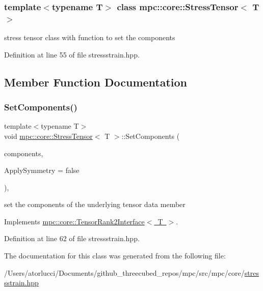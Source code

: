 \subsubsection*{template$<$typename T$>$\newline
class mpc\+::core\+::\+Stress\+Tensor$<$ T $>$}

stress tensor class with function to set the components 

Definition at line 55 of file stressstrain.\+hpp.



\subsection{Member Function Documentation}
\mbox{\label{structmpc_1_1core_1_1_stress_tensor_afbac9aaa45907cdbed3ed779b0551bad}} 
\subsubsection{\texorpdfstring{Set\+Components()}{SetComponents()}}
{\footnotesize\ttfamily template$<$typename T$>$ \\
void \mbox{\hyperlink{structmpc_1_1core_1_1_stress_tensor}{mpc\+::core\+::\+Stress\+Tensor}}$<$ T $>$\+::Set\+Components (\begin{DoxyParamCaption}\item[{std\+::set$<$ \mbox{\hyperlink{namespacempc_1_1core_a467e1fa517a8c269b033fef3aa281360}{mpc\+::core\+::\+Tensor\+Rank2\+Component}}$<$ T $>$ $>$ \&}]{components,  }\item[{bool}]{Apply\+Symmetry = {\ttfamily false} }\end{DoxyParamCaption})\hspace{0.3cm}{\ttfamily [inline]}, {\ttfamily [virtual]}}



set the components of the underlying tensor data member 



Implements \mbox{\hyperlink{structmpc_1_1core_1_1_tensor_rank2_interface_a7d220631fe32f06ec52e5724873a00d9}{mpc\+::core\+::\+Tensor\+Rank2\+Interface$<$ T $>$}}.



Definition at line 62 of file stressstrain.\+hpp.



The documentation for this class was generated from the following file\+:\begin{DoxyCompactItemize}
\item 
/\+Users/atorlucci/\+Documents/github\+\_\+threecubed\+\_\+repos/mpc/src/mpc/core/\mbox{\hyperlink{stressstrain_8hpp}{stressstrain.\+hpp}}\end{DoxyCompactItemize}

